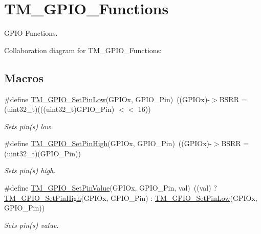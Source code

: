 \hypertarget{group___t_m___g_p_i_o___functions}{}\section{T\+M\+\_\+\+G\+P\+I\+O\+\_\+\+Functions}
\label{group___t_m___g_p_i_o___functions}


G\+P\+IO Functions.  


Collaboration diagram for T\+M\+\_\+\+G\+P\+I\+O\+\_\+\+Functions\+:
\subsection*{Macros}
\begin{DoxyCompactItemize}
\item 
\#define \hyperlink{group___t_m___g_p_i_o___functions_gaccceda87ce348c73b43780fdfed048d3}{T\+M\+\_\+\+G\+P\+I\+O\+\_\+\+Set\+Pin\+Low}(G\+P\+I\+Ox,  G\+P\+I\+O\+\_\+\+Pin)~((G\+P\+I\+Ox)-\/$>$B\+S\+RR = (uint32\+\_\+t)(((uint32\+\_\+t)G\+P\+I\+O\+\_\+\+Pin) $<$$<$ 16))
\begin{DoxyCompactList}\small\item\em Sets pin(s) low. \end{DoxyCompactList}\item 
\#define \hyperlink{group___t_m___g_p_i_o___functions_gac5aa8fbc39ed67f47972097fb7c8d69d}{T\+M\+\_\+\+G\+P\+I\+O\+\_\+\+Set\+Pin\+High}(G\+P\+I\+Ox,  G\+P\+I\+O\+\_\+\+Pin)~((G\+P\+I\+Ox)-\/$>$B\+S\+RR = (uint32\+\_\+t)(G\+P\+I\+O\+\_\+\+Pin))
\begin{DoxyCompactList}\small\item\em Sets pin(s) high. \end{DoxyCompactList}\item 
\#define \hyperlink{group___t_m___g_p_i_o___functions_gaf0bc34b72794ca43246ef88cfd261e80}{T\+M\+\_\+\+G\+P\+I\+O\+\_\+\+Set\+Pin\+Value}(G\+P\+I\+Ox,  G\+P\+I\+O\+\_\+\+Pin,  val)~((val) ? \hyperlink{group___t_m___g_p_i_o___functions_gac5aa8fbc39ed67f47972097fb7c8d69d}{T\+M\+\_\+\+G\+P\+I\+O\+\_\+\+Set\+Pin\+High}(G\+P\+I\+Ox, G\+P\+I\+O\+\_\+\+Pin) \+: \hyperlink{group___t_m___g_p_i_o___functions_gaccceda87ce348c73b43780fdfed048d3}{T\+M\+\_\+\+G\+P\+I\+O\+\_\+\+Set\+Pin\+Low}(G\+P\+I\+Ox, G\+P\+I\+O\+\_\+\+Pin))
\begin{DoxyCompactList}\small\item\em Sets pin(s) value. \end{DoxyCompactList}\item 
$$
\end{DoxyCompactItemize}
